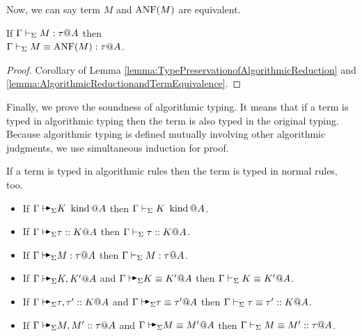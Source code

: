 Now, we can say term \( M \) and \( \text{ANF}(M) \) are equivalent.

\begin{lemma}
    \label{lemma:ANFandTermEquivalence}
    If \( \Gamma \vdash_\Sigma M : \tau @ A \) then \\ \({ \Gamma \vdash_\Sigma M \equiv \text{ANF}(M) : \tau @ A }\).
\end{lemma}
\begin{proof}
    Corollary of Lemma \ref{lemma:TypePreservationofAlgorithmicReduction} and
    \ref{lemma:AlgorithmicReductionandTermEquivalence}.
\end{proof}

Finally, we prove the soundness of algorithmic typing. It means that if a term
is typed in algorithmic typing then the term is also typed in the original
typing.  Because algorithmic typing is defined mutually involving other
algorithmic judgments, we use simultaneous induction for proof.

\begin{theorem}
    \label{theorem:SoundnessOfAlgorithmicTyping}
    If a term is typed in algorithmic rules then the term is typed in normal rules, too.
    \begin{itemize}
        \item If \(\G\AVS K \iskind @ A \) then \(\Gamma\vdash_\Sigma K \operatorname{\ kind} @A \).
        \item If \(\G\AVS \tau :: K @ A \) then \(\Gamma\vdash_\Sigma \tau ::K  @ A \).
        \item If \(\G\AVS M:\tau @ A \) then \(\Gamma\vdash_\Sigma M:\tau @ A \).
        \item If \(\G\AVS K,K' @ A\) and \(\G\AVS K\E K' @ A \) then \(\Gamma\vdash_\Sigma K\equiv K' @ A \).
        \item If \(\G\AVS \tau,\tau' :: K @ A \) and \(\G\AVS \tau \E \tau' @ A \) then \(\Gamma\vdash_\Sigma \tau \equiv \tau' :: K @ A \).
        \item If \(\G\AVS M,M' :: \tau @ A \) and \(\G\AVS M\E M' @ A \) then \(\Gamma\vdash_\Sigma M\equiv M' :: \tau @ A \).
    \end{itemize}
\end{theorem}

